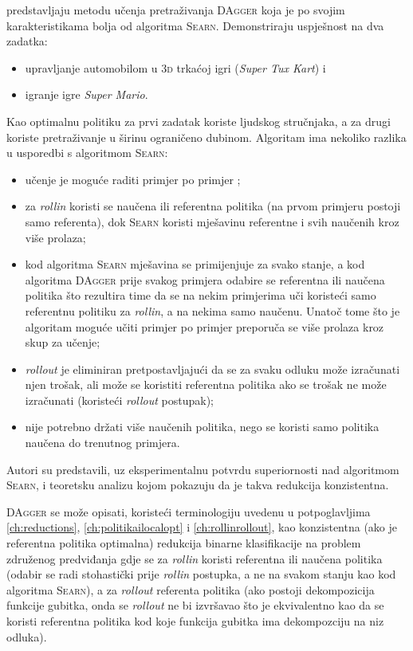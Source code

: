 \citet{ross2011reduction} predstavljaju metodu učenja pretraživanja
\textsc{DAgger}  koja je po svojim
karakteristikama bolja od algoritma \textsc{Searn}. Demonstriraju uspješnost na
dva zadatka:
\begin{itemize}
  \item upravljanje automobilom u \textsc{3d} trkaćoj igri (\textit{Super Tux
  Kart}) i
  \item igranje igre \textit{Super Mario}.
\end{itemize}
Kao optimalnu politiku za prvi zadatak koriste ljudskog stručnjaka, a za drugi
koriste pretraživanje u širinu  ograničeno
dubinom. Algoritam ima nekoliko razlika u usporedbi s algoritmom \textsc{Searn}:
\begin{itemize}
  \item učenje je moguće raditi primjer po primjer ;
  \item za \textit{rollin} koristi se naučena ili referentna politika (na prvom
  primjeru postoji samo referenta), dok \textsc{Searn} koristi mješavinu
  referentne i svih naučenih kroz više prolaza;
  \item kod algoritma \textsc{Searn} mješavina se primijenjuje za svako stanje,
  a kod algoritma \textsc{DAgger} prije svakog primjera odabire se referentna
  ili naučena politika što rezultira time da se na nekim primjerima uči koristeći
  samo referentnu politiku za \textit{rollin}, a na nekima samo naučenu. Unatoč
  tome što je algoritam moguće učiti primjer po primjer preporuča se više
  prolaza kroz skup za učenje;
  \item \textit{rollout} je eliminiran pretpostavljajući da se za svaku odluku
  može izračunati njen trošak, ali može se koristiti referentna politika ako se
  trošak ne može izračunati (koristeći \textit{rollout} postupak);
  \item nije potrebno držati više naučenih politika, nego se koristi samo politika
  naučena do trenutnog primjera.
\end{itemize}
Autori su predstavili, uz eksperimentalnu potvrdu superiornosti nad algoritmom
\textsc{Searn}, i teoretsku analizu kojom pokazuju da je takva redukcija
konzistentna.

\textsc{DAgger} se može opisati, koristeći terminologiju uvedenu u potpoglavljima
\ref{ch:reductions}, \ref{ch:politikailocalopt} i \ref{ch:rollinrollout}, kao
konzistentna (ako je referentna politika optimalna) redukcija binarne
klasifikacije na problem združenog predviđanja gdje se za \textit{rollin}
koristi referentna ili naučena politika (odabir se radi stohastički prije
\textit{rollin} postupka, a ne na svakom stanju kao kod algoritma
\textsc{Searn}), a za \textit{rollout} referenta politika (ako postoji
dekompozicija funkcije gubitka, onda se \textit{rollout} ne bi izvršavao što je
ekvivalentno kao da se koristi referentna politika kod koje funkcija gubitka ima
dekompozciju na niz odluka).
